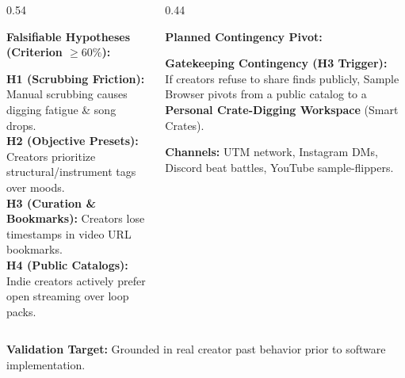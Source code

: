 \begin{frame}[t]
  \vspace{1.2mm}

  \begin{columns}[onlytextwidth, T]
    \begin{column}{0.54\textwidth}
      \begin{tcolorbox}[innercard, top=2.5pt, bottom=2.5pt, left=5pt, right=5pt]
        {\scriptsize\bfseries\textcolor{textwhite}{Falsifiable Hypotheses (Criterion $\ge 60\%$):}}\par\vspace{0.8mm}
        {\tiny\textbullet{} \textbf{H1 (Scrubbing Friction):} Manual scrubbing causes digging fatigue \& song drops.}\\[0.4mm]
        {\tiny\textbullet{} \textbf{H2 (Objective Presets):} Creators prioritize structural/instrument tags over moods.}\\[0.4mm]
        {\tiny\textbullet{} \textbf{H3 (Curation \& Bookmarks):} Creators lose timestamps in video URL bookmarks.}\\[0.4mm]
        {\tiny\textbullet{} \textbf{H4 (Public Catalogs):} Indie creators actively prefer open streaming over loop packs.}
      \end{tcolorbox}
    \end{column}

    \begin{column}{0.44\textwidth}
      \begin{tcolorbox}[innercard, top=2.5pt, bottom=2.5pt, left=5pt, right=5pt]
        {\scriptsize\bfseries\textcolor{accentemerald}{Planned Contingency Pivot:}}\par\vspace{0.6mm}
        {\tiny\textbf{Gatekeeping Contingency (H3 Trigger):}}\\[0.4mm]
        {\tiny If creators refuse to share finds publicly, Sample Browser pivots from a public catalog to a \textbf{Personal Crate-Digging Workspace} (Smart Crates).}\par\vspace{0.6mm}
        {\tiny\textbf{Channels:} UTM network, Instagram DMs, Discord beat battles, YouTube sample-flippers.}
      \end{tcolorbox}
    \end{column}
  \end{columns}

  \vspace{1.2mm}

  \begin{tcolorbox}[standardcard, left=6pt, right=6pt, top=2.5pt, bottom=2.5pt]
    \centering
    {\small\textbf{\textcolor{accentemerald}{Validation Target:}} \textcolor{textwhite}{Grounded in real creator past behavior prior to software implementation.}}
  \end{tcolorbox}
\end{frame}
